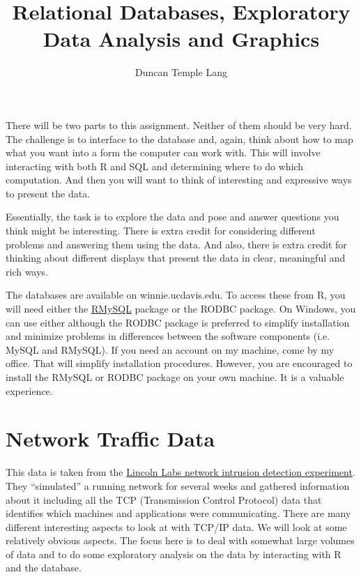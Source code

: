 \documentclass[11pt]{article}
\title{Relational Databases, Exploratory Data Analysis and Graphics}
\author{Duncan Temple Lang}
\begin{document}
\maketitle{}

There will be two parts to this assignment.  Neither of them should be
very hard.  The challenge is to interface to the database and, again,
think about how to map what you want into a form the computer can work
with.  This will involve interacting with both R and SQL and
determining where to do which computation.  And then you will want to
think of interesting and expressive ways to present the data.

Essentially, the task is to explore the data and pose and answer
questions you think might be interesting.  There is extra credit for
considering different problems and answering them using the data.  And
also, there is extra credit for thinking about different displays that
present the data in clear, meaningful and rich ways.


The databases are available on winnie.ucdavis.edu.  To access these
from R, you will need either the
\href{http://cran.r-project.org/src/contrib/RMySQL_0.5-3.tar.gz}{RMySQL}
package or the RODBC package.  On Windows, you can use either although
the RODBC package is preferred to simplify installation and minimize
problems in differences between the software components (i.e. MySQL
and RMySQL).  If you need an account on my machine, come by my office.
That will simplify installation procedures. However, you are
encouraged to install the RMySQL or RODBC package on your own machine.
It is a valuable experience.


\section{Network Traffic Data}
This data is taken from the
\href{http://www.ll.mit.edu/IST/ideval/data/1999/1999_data_index.html}{Lincoln
  Labs network intrusion detection experiment}.  They ``simulated'' a
running network for several weeks and gathered information about it
including all the TCP (Transmission Control Protocol) data that
identifies which machines and applications were communicating.  There
are many different interesting aspects to look at with TCP/IP data.
We will look at some relatively obvious aspects.  The focus here is to
deal with somewhat large volumes of data and to do some exploratory
analysis on the data by interacting with R and the database.
\end{document}

